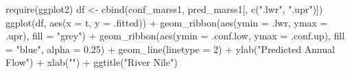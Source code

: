 \begin{Schunk}
\begin{Sinput}
 require(ggplot2)
 df <- cbind(conf_marss1, pred_marss1[, c(".lwr", ".upr")])
 ggplot(df, aes(x = t, y = .fitted)) +
   geom_ribbon(aes(ymin = .lwr, ymax = .upr), fill = "grey") +
   geom_ribbon(aes(ymin = .conf.low, ymax = .conf.up), fill = "blue", alpha = 0.25) +
   geom_line(linetype = 2) +
   ylab("Predicted Annual Flow") +
   xlab("") +
   ggtitle("River Nile")
\end{Sinput}
\end{Schunk}
